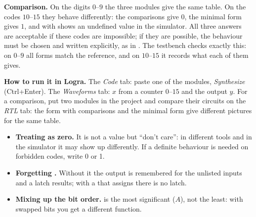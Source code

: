
\textbf{Comparison.} On the digits $0$--$9$ the three modules give the same
table. On the codes $10$--$15$ they behave differently: the comparisons give
$0$, the minimal form gives $1$, and  with  shows an undefined
value in the simulator. All three answers are acceptable if these codes are
impossible; if they are possible, the behaviour must be chosen and written
explicitly, as in . The testbench 
checks exactly this: on $0$--$9$ all forms match the reference, and on $10$--$15$
it records what each of them gives.


\textbf{How to run it in Logra.} The \emph{Code} tab: paste one of the
modules, \emph{Synthesize} (Ctrl+Enter). The \emph{Waveforms} tab: $x$ from a
counter $0$--$15$ and the output $y$. For a comparison, put two modules in
the project and compare their circuits on the \emph{RTL} tab: the form with
comparisons and the minimal form give different pictures for the same table.

\begin{warnbox}
\begin{itemize}
  \item \textbf{Treating  as zero.} It is not a value but ``don't care'':
        in different tools and in the simulator it may show up differently.
        If a definite behaviour is needed on forbidden codes, write 0 or 1.
  \item \textbf{Forgetting .} Without it the output is remembered
        for the unlisted inputs and a latch results; with a 
        that assigns  there is no latch.
  \item \textbf{Mixing up the bit order.}  is the most significant
        ($A$), not the least: with swapped bits you get a different function.
\end{itemize}
\end{warnbox}

